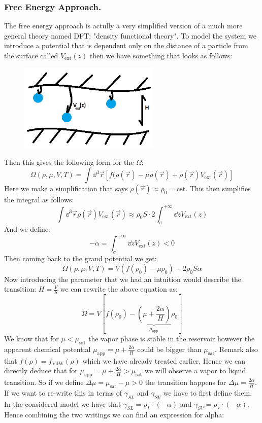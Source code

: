 \documentclass[10pt,a4paper]{book}
\begin{document}
\subsubsection{Free Energy Approach.}
The free energy approach is actully a very simplified version of a much more general theory named DFT: "density functional theory". To model the system we introduce a potential that is dependent only on the distance of a particle from the surface called $V_\text{ext}(z)$ then we have something that looks as follows:
\begin{figure}[h!]
\centering
\includegraphics[width = 0.6\textwidth]{graphs/capillaryCondensationDFT}
\end{figure}
Then this gives the following form for the $\Omega$:
\[
\Omega(\rho, \mu, V, T) = \int \dd^3 \vec{r}\left[ f(\rho(\vec{r}) - \mu \rho(\vec{r}) + \rho(\vec{r}) V_\text{ext}(\vec{r}) \right]
\]
Here we make a simplification that says $\rho(\vec{r}) \approx \rho_0 = \text{cst}$. This then simplifies the integral as follows:
\[
\int \dd^3 \vec{r} \rho(\vec{r}) V_\text{ext}(\vec{r}) \approx \rho_0 S \cdot 2 \int_\sigma^{+\infty} \dd z V_\text{ext}(z)
\]
And we define:
\[
-\alpha = \int_\sigma^{+\infty} \dd z V_\text{ext}(z) < 0
\]
Then coming back to the grand potential we get:
\[
\Omega(\rho, \mu, V, T) = V(f(\rho_0) - \mu \rho_0) - 2 \rho_0 S \alpha
\]
Now introducing the parameter that we had an intuition would describe the transition: $H = \frac{V}{S}$ we can rewrite the above equation as:
\[
\Omega = V \left[ f(\rho_0) - \underbrace{\left(\mu + \frac{2\alpha}{H}\right)}_{\mu_\text{app}} \rho_0 \right]
\]
We know that for $\mu < \mu_\text{sat}$ the vapor phase is stable in the reservoir however the apparent chemical potential $\mu_\text{app} = \mu + \frac{2\alpha}{H}$ could be bigger than $\mu_\text{sat}$. Remark also that $f(\rho) = f_\text{VdW}(\rho)$ which we have already treated earlier. Hence we can directly deduce that for $\mu_\text{app} = \mu + \frac{2\alpha}{H} > \mu_\text{sat}$ we will observe a vapor to liquid transition. So if we define $\Delta \mu = \mu_\text{sat} - \mu > 0$ the transition happens for $\Delta \mu = \frac{2 \alpha}{H}$. If we want to re-write this in terms of $\gamma_{SL}$ and $\gamma_{SV}$ we have to first define them. In the considered model we have that $\gamma_{SL} = \rho_L \cdot (-\alpha)$ and $\gamma_{SV} = \rho_V \cdot (-\alpha)$. Hence combining the two writings we can find an expression for alpha:
\end{document}
